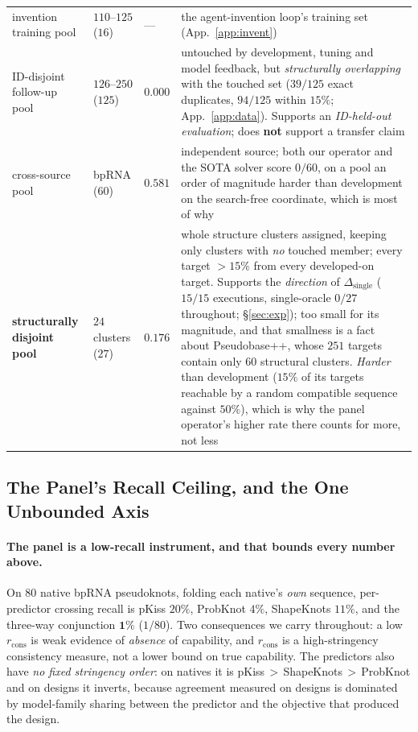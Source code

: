 \documentclass[11pt]{article}
\begin{document}
\begin{table}[t]
\begin{tabularx}{\linewidth}{@{}>{\raggedright\arraybackslash}p{2.7cm}>{\raggedright\arraybackslash}p{1.3cm}>{\centering\arraybackslash}p{1.15cm}L@{}}
invention training pool & $110$--$125$ ($16$) & --- & the agent-invention loop's training set (App.~\ref{app:invent})\\
ID-disjoint follow-up pool & $126$--$250$ ($125$) & $0.000$ & untouched by development, tuning and model feedback, but
\emph{structurally overlapping} with the touched set ($39/125$ exact duplicates, $94/125$ within $15\%$;
App.~\ref{app:data}). Supports an \emph{ID-held-out evaluation}; does \textbf{not} support a transfer claim\\
cross-source pool & bpRNA ($60$) & $\mathbf{0.581}$ & independent source; both our operator and the SOTA
solver score $0/60$, on a pool an order of magnitude harder than development on the search-free
coordinate, which is most of why\\
\midrule
\textbf{structurally disjoint pool} & $24$ clusters ($27$) & $\mathbf{0.176}$ & whole structure clusters
assigned, keeping only
clusters with \emph{no} touched member; every target $>15\%$ from every developed-on target. Supports the
\emph{direction} of $\Delta_{\mathrm{single}}$ ($15/15$ executions, single-oracle $0/27$ throughout;
\S\ref{sec:exp}); too small for its magnitude, and that smallness is a fact about Pseudobase++, whose
$251$ targets contain only $60$ structural clusters. \emph{Harder} than development ($15\%$ of its targets
reachable by a random compatible sequence against $50\%$), which is why the panel operator's higher rate there
counts for more, not less\\
\bottomrule
\end{tabularx}
\end{table}


\subsection{The Panel's Recall Ceiling, and the One Unbounded Axis}\label{sec:exp:stats}
\paragraph{The panel is a low-recall instrument, and that bounds every number above.} On $80$ native bpRNA
pseudoknots, folding each native's \emph{own} sequence, per-predictor crossing recall is pKiss $20\%$, ProbKnot
$4\%$, ShapeKnots $11\%$, and the three-way conjunction $\mathbf{1\%}$ ($1/80$). Two consequences we carry
throughout: a low $r_{\mathrm{cons}}$ is weak evidence of \emph{absence} of capability, and $r_{\mathrm{cons}}$
is a high-stringency consistency measure, not a lower bound on true capability. The predictors also have
\emph{no fixed stringency order}: on natives it is pKiss\,$>$\,ShapeKnots\,$>$\,ProbKnot and on designs it
inverts, because agreement measured on designs is dominated by model-family sharing between the predictor and
the objective that produced the design.
\end{document}
